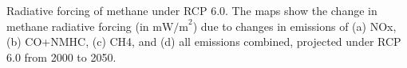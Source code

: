 Radiative forcing of methane under RCP 6.0. The maps show the change in methane radiative forcing (in $\mathrm{mW/m}^2$) due to changes in emissions of (a) NOx, (b) CO+NMHC, (c) CH4, and (d) all emissions combined, projected under RCP 6.0 from 2000 to 2050. \label{fig:eqems}